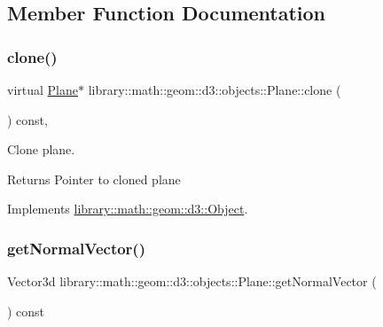 \subsection{Member Function Documentation}
\mbox{\label{classlibrary_1_1math_1_1geom_1_1d3_1_1objects_1_1_plane_a7ceb970c35968551600e2380795a0a4c}} 
\subsubsection{\texorpdfstring{clone()}{clone()}}
{\footnotesize\ttfamily virtual \hyperlink{classlibrary_1_1math_1_1geom_1_1d3_1_1objects_1_1_plane}{Plane}$\ast$ library\+::math\+::geom\+::d3\+::objects\+::\+Plane\+::clone (\begin{DoxyParamCaption}{ }\end{DoxyParamCaption}) const\hspace{0.3cm}{\ttfamily [override]}, {\ttfamily [virtual]}}



Clone plane. 

\begin{DoxyReturn}{Returns}
Pointer to cloned plane 
\end{DoxyReturn}


Implements \hyperlink{classlibrary_1_1math_1_1geom_1_1d3_1_1_object_a1a784c6b359e0eb97cd34fabc42f2f3f}{library\+::math\+::geom\+::d3\+::\+Object}.

\mbox{\label{classlibrary_1_1math_1_1geom_1_1d3_1_1objects_1_1_plane_a9d34608a389d4c80dad6b6f58b82c0e4}} 
\subsubsection{\texorpdfstring{get\+Normal\+Vector()}{getNormalVector()}}
{\footnotesize\ttfamily Vector3d library\+::math\+::geom\+::d3\+::objects\+::\+Plane\+::get\+Normal\+Vector (\begin{DoxyParamCaption}{ }\end{DoxyParamCaption}) const}



